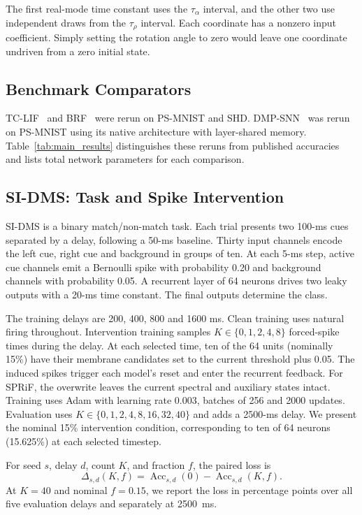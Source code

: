 \documentclass[letterpaper,journal]{IEEEtran}
\DeclareMathOperator{\Acc}{Acc}
\begin{document}
The first real-mode time constant uses the $\tau_\alpha$ interval, and the other two use independent draws from the $\tau_\rho$ interval. Each coordinate has a nonzero input coefficient. Simply setting the rotation angle to zero would leave one coordinate undriven from a zero initial state.

\subsection{Benchmark Comparators}
\label{sec:baselines}

TC-LIF~\cite{tclif} and BRF~\cite{brf} were rerun on PS-MNIST and SHD. DMP-SNN~\cite{sun2026dmp} was rerun on PS-MNIST using its native architecture with layer-shared memory. Table~\ref{tab:main_results} distinguishes these reruns from published accuracies and lists total network parameters for each comparison.

\subsection{SI-DMS: Task and Spike Intervention}
\label{sec:sidms}

SI-DMS is a binary match/non-match task. Each trial presents two 100-ms cues separated by a delay, following a 50-ms baseline. Thirty input channels encode the left cue, right cue and background in groups of ten. At each 5-ms step, active cue channels emit a Bernoulli spike with probability 0.20 and background channels with probability 0.05. A recurrent layer of 64 neurons drives two leaky outputs with a 20-ms time constant. The final outputs determine the class.

The training delays are 200, 400, 800 and 1600 ms. Clean training uses natural firing throughout. Intervention training samples $K\in\{0,1,2,4,8\}$ forced-spike times during the delay. At each selected time, ten of the 64 units (nominally 15\%) have their membrane candidates set to the current threshold plus 0.05. The induced spikes trigger each model's reset and enter the recurrent feedback. For SPRiF, the overwrite leaves the current spectral and auxiliary states intact. Training uses Adam with learning rate 0.003, batches of 256 and 2000 updates. Evaluation uses $K\in\{0,1,2,4,8,16,32,40\}$ and adds a 2500-ms delay. We present the nominal 15\% intervention condition, corresponding to ten of 64 neurons (15.625\%) at each selected timestep.

For seed $s$, delay $d$, count $K$, and fraction $f$, the paired loss is
\begin{equation}
\Delta_{s,d}(K,f)=
\Acc_{s,d}(0)-\Acc_{s,d}(K,f).
\label{eq:paired_loss}
\end{equation}
At $K=40$ and nominal $f=0.15$, we report the loss in percentage points over all five evaluation delays and separately at 2500~ms.
\end{document}
